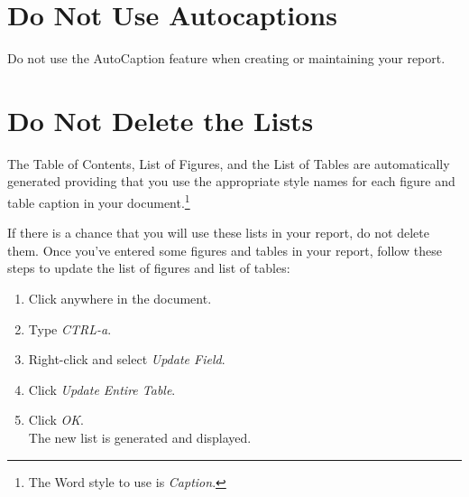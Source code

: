 \section{Do Not Use Autocaptions}
Do not use the AutoCaption feature when creating or maintaining your report.

\section{Do Not Delete the Lists}
The Table of Contents, List of Figures, and the List of Tables are automatically generated providing that you use the appropriate style names for each figure and table caption in your document.\footnote{The Word style to use is \textit{Caption}.}

If there is a chance that you will use these lists in your report, do not delete them. Once you've entered some figures and tables in your report, follow these steps to update the list of figures and list of tables:
\begin{enumerate}
\item Click anywhere in the document.
\item Type \textit{CTRL-a}.
\item Right-click and select \textit{Update Field}.
\item Click \textit{Update Entire Table}.
\item Click \textit{OK}.\\The new list is generated and displayed. 
\end{enumerate}
